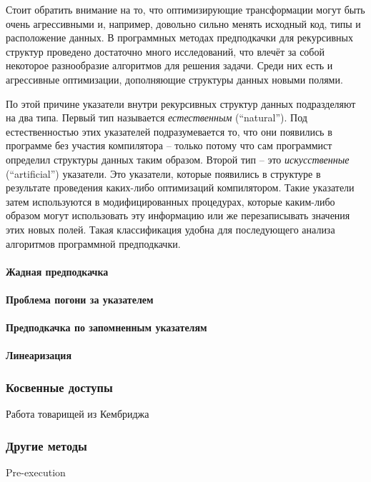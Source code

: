 \documentclass[12pt,a4paper]{article}
\begin{document}
Стоит обратить внимание на то, что оптимизирующие трансформации могут быть очень агрессивными и, например, довольно сильно менять исходный код, типы и расположение данных. В программных методах предподкачки для рекурсивных структур проведено достаточно много исследований, что влечёт за собой некоторое разнообразие алгоритмов для решения задачи. Среди них есть и агрессивные оптимизации, дополняющие структуры данных новыми полями.

По этой причине указатели внутри рекурсивных структур данных подразделяют на два типа. Первый тип называется \emph{естественным} (``natural''). Под естественностью этих указателей подразумевается то, что они появились в программе без участия компилятора -- только потому что сам программист определил структуры данных таким образом. Второй тип -- это \emph{искусственные} (``artificial'') указатели. Это указатели, которые появились в структуре в результате проведения каких-либо оптимизаций компилятором. Такие указатели затем используются в модифицированных процедурах, которые каким-либо образом могут использовать эту информацию или же перезаписывать значения этих новых полей. Такая классификация удобна для последующего анализа алгоритмов программной предподкачки.

\paragraph{Жадная предподкачка}

\paragraph{Проблема погони за указателем}

\paragraph{Предподкачка по запомненным указателям}

\paragraph{Линеаризация}

\subsubsection{Косвенные доступы}
Работа товарищей из Кембриджа

\subsubsection{Другие методы}
Pre-execution
\end{document}
